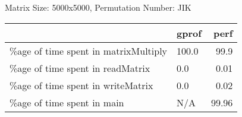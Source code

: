 \documentclass{article}
\begin{document}
    Matrix Size: 5000x5000, Permutation Number: JIK \\
    \begin{tabular}{llr}
\hline
                                      & gprof   &   perf \\
\hline
 \%age of time spent in matrixMultiply & 100.0   &  99.9  \\
 \%age of time spent in readMatrix     & 0.0     &   0.01 \\
 \%age of time spent in writeMatrix    & 0.0     &   0.02 \\
 \%age of time spent in main           & N/A     &  99.96 \\
\hline
\end{tabular}
    
\end{document}
